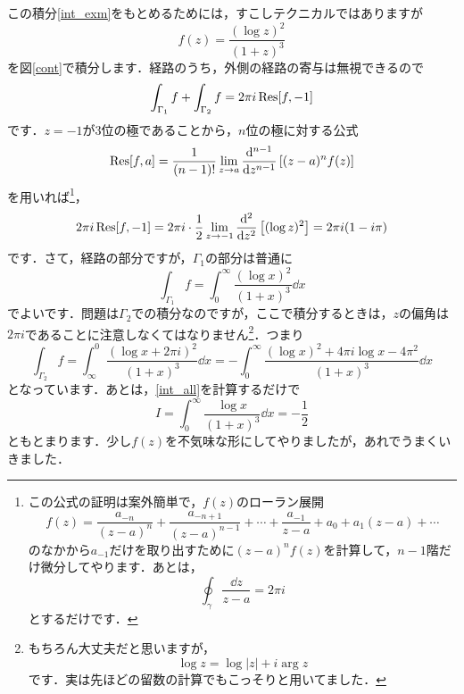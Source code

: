\documentclass[a4paper,pdflatex,ja=standard]{bxjsarticle}
\begin{document}
\begin{itemize}
  この積分\eqref{int_exm}をもとめるためには，すこしテクニカルではありますが
  \begin{equation}
    f(z)
    =
    \frac{(\log z)^2}{(1+z)^3}
  \end{equation}
  を図\ref{cont}で積分します．経路のうち，外側の経路の寄与は無視できるので
  \begin{equation}
    \int_{\Gamma_{1}}f
    +
    \int_{\Gamma_{2}}f
    =
    2\pi i\Res[f,-1]
    \label{int_all}
  \end{equation}
  です．$z=-1$が3位の極であることから，$n$位の極に対する公式
  \begin{equation}
    \Res[f,a]
    =
    \frac{1}{(n-1)!}
    \lim_{z\rightarrow a}
    \dv[n-1]{}{z}
    \left[ (z-a)^{n}f(z) \right]
  \end{equation}
  を用いれば\footnote{この公式の証明は案外簡単で，$f(z)$のローラン展開
  \begin{equation}
    \nonumber
    f(z)
    =
    \frac{a_{-n}}{(z-a)^{n}}
    +
    \frac{a_{-n+1}}{(z-a)^{n-1}}
    +
    \cdots
    +
    \frac{a_{-1}}{z-a}
    +
    a_{0}
    +
    a_{1}(z-a)
    +
    \cdots
  \end{equation}
  のなかから$a_{-1}$だけを取り出すために$(z-a)^{n}f(z)$を計算して，$n-1$階だけ微分してやります．あとは，
  \begin{equation}
    \nonumber
    \oint_{\gamma}\frac{\dd z}{z-a}
    =
    2\pi i
  \end{equation}
  とするだけです．
  }，
  \begin{equation}
    2\pi i\Res[f,-1]
    =
    2\pi i
    \cdot
    \frac{1}{2}\lim_{z\rightarrow -1}
    \dv[2]{}{z}\left[ (\log z)^2 \right]
    =
    2\pi i(1-i\pi)
  \end{equation}
  です．さて，経路の部分ですが，$\Gamma_{1}$の部分は普通に
  \begin{equation}
    \int_{\Gamma_{1}}f
    =
    \int_{0}^{\infty}\frac{(\log x)^2}{(1+x)^3}\dd x
  \end{equation}
  でよいです．問題は$\Gamma_{2}$での積分なのですが，ここで積分するときは，$z$の偏角は$2\pi i$であることに注意しなくてはなりません\footnote{
    もちろん大丈夫だと思いますが，
    \begin{equation}
      \log z
      =
      \log |z|
      +
      i\arg z
      \nonumber
    \end{equation}
    です．実は先ほどの留数の計算でもこっそりと用いてました．
  }．つまり
  \begin{equation}
    \int_{\Gamma_{2}}f
    =
    \int_{\infty}^{0}\frac{(\log x+2\pi i)^2}{(1+x)^3}\dd x
    =
    -\int_{0}^{\infty}\frac{(\log x)^2+4\pi i\log x-4\pi^2}{(1+x)^3}\dd x
  \end{equation}
  となっています．あとは，\eqref{int_all}を計算するだけで
  \begin{equation}
    I
    =
    \int_{0}^{\infty}
    \frac{\log x}{(1+x)^3}\dd x
    =
    -\frac{1}{2}
  \end{equation}
  ともとまります．少し$f(z)$を不気味な形にしてやりましたが，あれでうまくいきました．  


\end{itemize}
\end{document}

